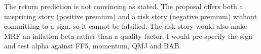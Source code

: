 The return prediction is not convincing as stated. The proposal offers both a mispricing story (positive premium) and a risk story (negative premium) without committing to a sign, so it cannot be falsified. The risk story would also make MRF an inflation beta rather than a quality factor. I would pre-specify the sign and test alpha against FF5, momentum, QMJ and BAB.

